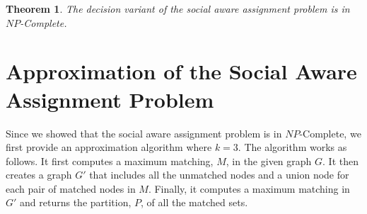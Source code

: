 \documentclass[letterpaper]{article} %
\newtheorem{theorem}{Theorem}
\begin{document}
\begin{theorem}
The decision variant of the social aware assignment problem is in $NP$-Complete.
\end{theorem}

\section{Approximation of the Social Aware Assignment Problem}
Since we showed that the social aware assignment problem is in $NP$-Complete, we first provide an approximation algorithm where $k=3$.
The algorithm works as follows. It first computes a maximum matching, $M$, in the given graph $G$. It then creates a graph $G'$ that includes all the unmatched nodes and a union node for each pair of matched nodes in $M$. Finally, it computes a maximum matching in $G'$ and returns the partition, $P$, of all the matched sets.

\end{document}
